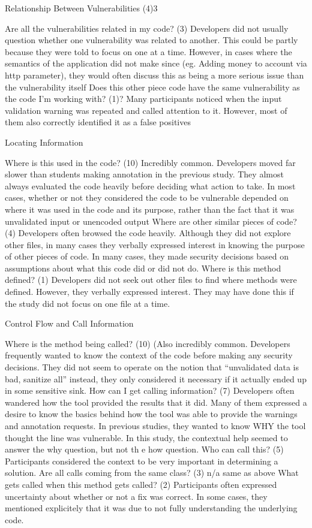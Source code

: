\documentclass[twoside,letterpaper]{soups}
\begin{document}
 Relationship Between Vulnerabilities (4){3}

Are all the vulnerabilities related in my code? (3) Developers did not usually question whether one vulnerability was related to another. This could be partly because they were told to focus on one at a time. However, in cases where the semantics of the application did not make since (eg. Adding money to account via http parameter), they would often discuss this as being a more serious issue than the vulnerability itself 
Does this other piece code have the same vulnerability as the code I’m working with? (1)? Many participants noticed when the  input validation warning was repeated and called attention to it. However, most of them also correctly identified it as a false positives

Locating Information

Where is this used in the code? (10) Incredibly common. Developers moved far slower than students making annotation in the previous study. They almost always evaluated the code heavily before deciding what action to take. In most cases, whether or not they considered the code to be vulnerable depended on where it was used in the code and its purpose, rather than the fact that it was unvalidated input or unencoded output
Where are other similar pieces of code? (4) Developers often browsed the code heavily. Although they did not explore other files, in many cases they verbally expressed interest in knowing the purpose of other pieces of code. In many cases, they made security decisions based on assumptions about what this code did or did not do. 
Where is this method defined? (1) Developers did not seek out other files to find where methods were defined. However, they verbally expressed interest. They may have done this if the study did not focus on one file at a time.

Control Flow and Call Information

Where is the method being called? (10) (Also incredibly common. Developers frequently wanted to know the context of the code before making any security decisions. They did not seem to operate on the notion that “unvalidated data is bad, sanitize all” instead, they only considered it necessary if it actually ended up in some sensitive sink.
How can I get calling information? (7) Developers often wandered how the tool provided the results that it did. Many of them expressed a desire to know the basics behind how the tool was able to provide the warnings and annotation requests. In previous studies, they wanted to know WHY the tool thought the line was vulnerable. In this study, the contextual help seemed to answer the why question, but not th e how question.
Who can call this? (5) Participants considered the context to be very important in determining a solution.
Are all calls coming from the same class? (3) n/a same as above
What gets called when this method gets called? (2) Participants often expressed uncertainty about whether or not a fix was correct. In some cases, they mentioned explicitely that it was due to not fully understanding the underlying code.
\end{document}
